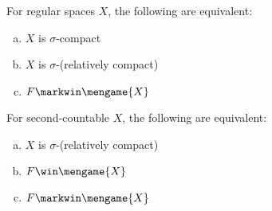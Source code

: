   \begin{cor}
    For regular spaces $X$, the following are equivalent:
      \begin{enumerate}[(a)]
        \item $X$ is $\sigma$-compact
        \item $X$ is $\sigma$-(relatively compact)
        \item $F \markwin \mengame{X}$
      \end{enumerate}
  \end{cor}

  \begin{thm}
    For second-countable $X$, the following are equivalent:
      \begin{enumerate}[(a)]
        \item $X$ is $\sigma$-(relatively compact)
        \item $F \win \mengame{X}$
        \item $F\markwin \mengame{X}$
      \end{enumerate}
  \end{thm}

